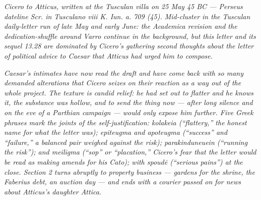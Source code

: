 
\textit{Cicero to Atticus, written at the Tusculan villa on 25 May
45 BC --- Perseus dateline \textit{Scr. in Tusculano viii K. Iun.
a. 709 (45)}. Mid-cluster in the Tusculan daily-letter run of late
May and early June: the \textit{Academica} revision and the
dedication-shuffle around Varro continue in the background, but
this letter and its sequel 13.28 are dominated by Cicero's
gathering second thoughts about the letter of political advice
to Caesar that Atticus had urged him to compose.}

\textit{Caesar's intimates have now read the draft and have come
back with so many demanded alterations that Cicero seizes on
their reaction as a way out of the whole project. The texture is
candid relief: he had set out to flatter and he knows it, the
substance was hollow, and to send the thing now --- after long
silence and on the eve of a Parthian campaign --- would only
expose him further. Five Greek phrases mark the joints of the
self-justification: \textit{kolakeia} (``flattery,'' the honest
name for what the letter was); \textit{epiteugma} and
\textit{apoteugma} (``success'' and ``failure,'' a balanced pair
weighed against the risk); \textit{parakinduneuein} (``running the
risk''); and \textit{meiligma} (``sop'' or ``placation,'' Cicero's
fear that the letter would be read as making amends for his
\textit{Cato}); with \textit{spoud\=e} (``serious pains'') at the
close. Section 2 turns abruptly to property business --- gardens
for the shrine, the Faberius debt, an auction day --- and ends
with a courier passed on for news about Atticus's daughter
Attica.}
